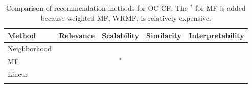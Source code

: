 \begin{table*}[!t]
	\centering

		\begin{tabular}{llccc}
		\toprule
		\toprule	
		\textbf{Method} & \textbf{Relevance} & \textbf{Scalability} & \textbf{Similarity} & \textbf{Interpretability} \\
		\toprule
		Neighborhood & \cross & \tick & \tick & \tick \\
		MF & \cross & \tick$^*$  & \cross & \cross \\
		Linear & \tick & \cross & \tick & \tick \\
		\LinearLow & \tick & \tick & \tick & \tick \\
		\bottomrule
		\end{tabular}
	\caption{Comparison of recommendation methods for OC-CF. The $^*$ for MF is added because weighted MF, WRMF, is relatively expensive.}
	\label{tbl:comparison}
\end{table*}
